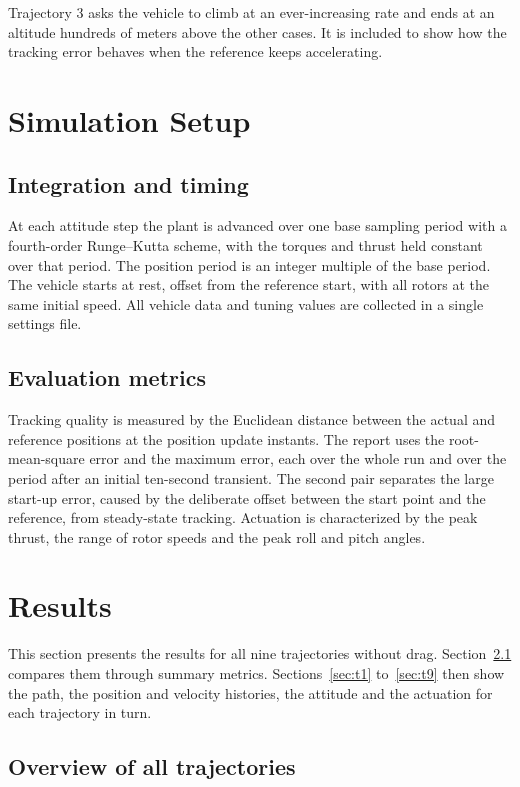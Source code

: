 \documentclass[11pt,a4paper]{article}
\numberwithin{equation}{section}
\begin{document}
Trajectory 3 asks the vehicle to climb at an ever-increasing rate and ends at an altitude hundreds of meters above the other cases. It is included to show how the tracking error behaves when the reference keeps accelerating.

\section{Simulation Setup}\label{sec:setup}

\subsection{Integration and timing}

At each attitude step the plant is advanced over one base sampling period with a fourth-order Runge--Kutta scheme, with the torques and thrust held constant over that period. The position period is an integer multiple of the base period. The vehicle starts at rest, offset from the reference start, with all rotors at the same initial speed. All vehicle data and tuning values are collected in a single settings file.

\subsection{Evaluation metrics}

Tracking quality is measured by the Euclidean distance between the actual and reference positions at the position update instants. The report uses the root-mean-square error and the maximum error, each over the whole run and over the period after an initial ten-second transient. The second pair separates the large start-up error, caused by the deliberate offset between the start point and the reference, from steady-state tracking. Actuation is characterized by the peak thrust, the range of rotor speeds and the peak roll and pitch angles.

\section{Results}\label{sec:results}

This section presents the results for all nine trajectories without drag. Section~\ref{sec:overview} compares them through summary metrics. Sections~\ref{sec:t1} to~\ref{sec:t9} then show the path, the position and velocity histories, the attitude and the actuation for each trajectory in turn.

\subsection{Overview of all trajectories}\label{sec:overview}
\end{document}
